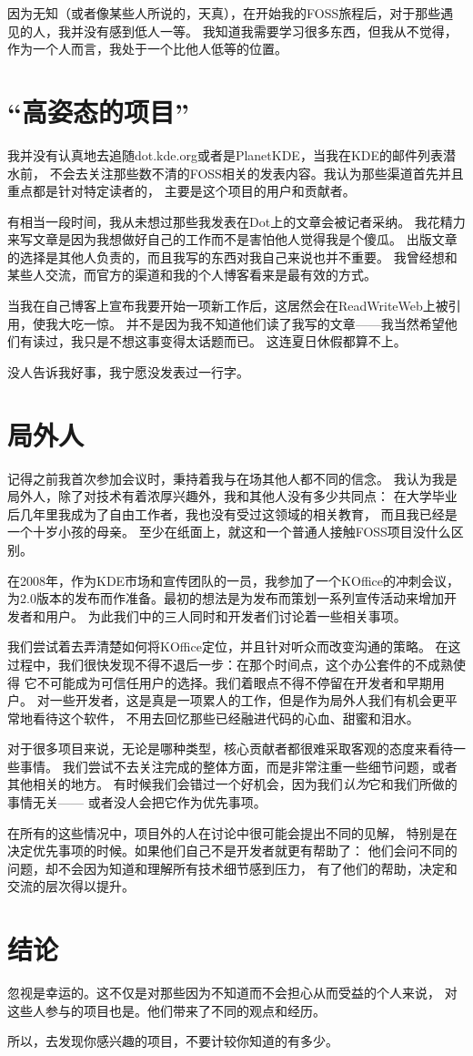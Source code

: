 因为无知（或者像某些人所说的，天真），在开始我的FOSS旅程后，对于那些遇见的人，我并没有感到低人一等。
我知道我需要学习很多东西，但我从不觉得，作为一个人而言，我处于一个比他人低等的位置。

\section*{“高姿态的项目”}

我并没有认真地去追随dot.kde.org或者是PlanetKDE，当我在KDE的邮件列表潜水前，
不会去关注那些数不清的FOSS相关的发表内容。我认为那些渠道首先并且重点都是针对特定读者的，
主要是这个项目的用户和贡献者。

有相当一段时间，我从未想过那些我发表在Dot上的文章会被记者采纳。
我花精力来写文章是因为我想做好自己的工作而不是害怕他人觉得我是个傻瓜。
出版文章的选择是其他人负责的，而且我写的东西对我自己来说也并不重要。
我曾经想和某些人交流，而官方的渠道和我的个人博客看来是最有效的方式。

当我在自己博客上宣布我要开始一项新工作后，这居然会在ReadWriteWeb上被引用，使我大吃一惊。
并不是因为我不知道他们读了我写的文章——我当然希望他们有读过，我只是不想这事变得太话题而已。
这连夏日休假都算不上。

没人告诉我好事，我宁愿没发表过一行字。

\section*{局外人}

记得之前我首次参加会议时，秉持着我与在场其他人都不同的信念。
我认为我是局外人，除了对技术有着浓厚兴趣外，我和其他人没有多少共同点：
在大学毕业后几年里我成为了自由工作者，我也没有受过这领域的相关教育，
而且我已经是一个十岁小孩的母亲。
至少在纸面上，就这和一个普通人接触FOSS项目没什么区别。

在2008年，作为KDE市场和宣传团队的一员，我参加了一个KOffice的冲刺会议，
为2.0版本的发布而作准备。最初的想法是为发布而策划一系列宣传活动来增加开发者和用户。
为此我们中的三人同时和开发者们讨论着一些相关事项。

我们尝试着去弄清楚如何将KOffice定位，并且针对听众而改变沟通的策略。
在这过程中，我们很快发现不得不退后一步：在那个时间点，这个办公套件的不成熟使得
它不可能成为可信任用户的选择。我们着眼点不得不停留在开发者和早期用户。
对一些开发者，这是真是一项累人的工作，但是作为局外人我们有机会更平常地看待这个软件，
不用去回忆那些已经融进代码的心血、甜蜜和泪水。

对于很多项目来说，无论是哪种类型，核心贡献者都很难采取客观的态度来看待一些事情。
我们尝试不去关注完成的整体方面，而是非常注重一些细节问题，或者其他相关的地方。
有时候我们会错过一个好机会，因为我们\textit{认为}它和我们所做的事情无关——
或者没人会把它作为优先事项。

在所有的这些情况中，项目外的人在讨论中很可能会提出不同的见解，
特别是在决定优先事项的时候。如果他们自己不是开发者就更有帮助了：
他们会问不同的问题，却不会因为知道和理解所有技术细节感到压力，
有了他们的帮助，决定和交流的层次得以提升。

\section*{结论}

忽视是幸运的。这不仅是对那些因为不知道而不会担心从而受益的个人来说，
对这些人参与的项目也是。他们带来了不同的观点和经历。

所以，去发现你感兴趣的项目，不要计较你知道的有多少。
